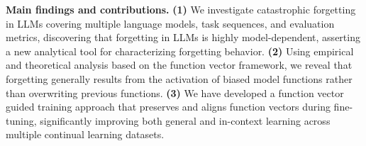 \textbf{Main findings and contributions.}
\textbf{(1)} We investigate catastrophic forgetting in LLMs covering multiple language models, task sequences, and evaluation metrics, discovering that forgetting in LLMs is highly model-dependent, asserting a new analytical tool for characterizing forgetting behavior.
\textbf{(2)} Using empirical and theoretical analysis based on the function vector framework, we reveal that forgetting generally results from the activation of biased model functions rather than overwriting previous functions.
\textbf{(3)} We have developed a function vector guided training approach that preserves and aligns function vectors during fine-tuning, significantly improving both general and in-context learning across multiple continual learning datasets.




